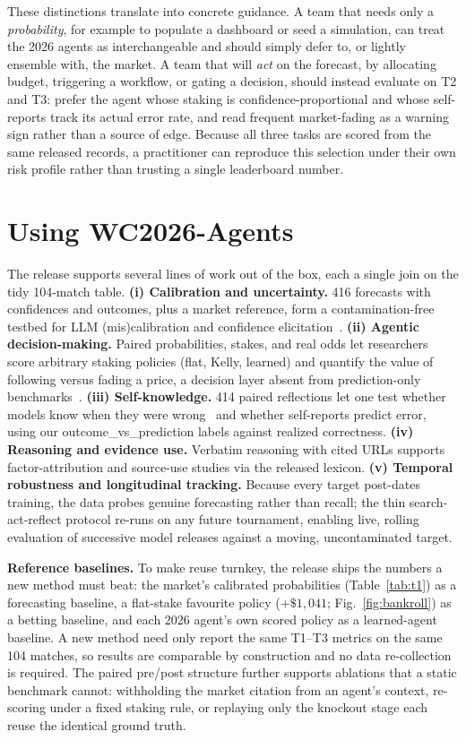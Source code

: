\documentclass[sigconf,review]{acmart}
\begin{document}
These distinctions translate into concrete guidance. A team that needs only a
\emph{probability}, for example to populate a dashboard or seed a simulation, can
treat the 2026 agents as interchangeable and should simply defer to, or lightly
ensemble with, the market. A team that will \emph{act} on the forecast, by
allocating budget, triggering a workflow, or gating a decision, should instead
evaluate on T2 and T3: prefer the agent whose staking is confidence-proportional
and whose self-reports track its actual error rate, and read frequent
market-fading as a warning sign rather than a source of edge. Because all three
tasks are scored from the same released records, a practitioner can reproduce
this selection under their own risk profile rather than trusting a single
leaderboard number.

\section{Using WC2026-Agents}
\label{sec:using}
The release supports several lines of work out of the box, each a single join on
the tidy 104-match table. \textbf{(i) Calibration and uncertainty.} 416
forecasts with confidences and outcomes, plus a market reference, form a
contamination-free testbed for LLM (mis)calibration and confidence
elicitation~\cite{tian2023calibration,xiong2024uncertainty}. \textbf{(ii) Agentic
decision-making.} Paired probabilities, stakes, and real odds let researchers
score arbitrary staking policies (flat, Kelly, learned) and quantify the value of
following versus fading a price, a decision layer absent from prediction-only
benchmarks~\cite{karger2024forecastbench}. \textbf{(iii) Self-knowledge.} 414
paired reflections let one test whether models know when they were
wrong~\cite{kadavath2022know,huang2024selfcorrect} and whether self-reports
predict error, using our \textsf{outcome\_vs\_prediction} labels against realized
correctness. \textbf{(iv) Reasoning and evidence use.} Verbatim reasoning with
cited URLs supports factor-attribution and source-use studies via the released
lexicon. \textbf{(v) Temporal robustness and longitudinal tracking.} Because every
target post-dates training, the data probes genuine forecasting rather than
recall; the thin search-act-reflect protocol re-runs on any future tournament,
enabling live, rolling evaluation of successive model releases against a moving,
uncontaminated target.

\textbf{Reference baselines.} To make reuse turnkey, the release ships the
numbers a new method must beat: the market's calibrated probabilities
(Table~\ref{tab:t1}) as a forecasting baseline, a flat-stake favourite policy
($+\$1{,}041$; Fig.~\ref{fig:bankroll}) as a betting baseline, and each 2026
agent's own scored policy as a learned-agent baseline. A new method need only
report the same T1--T3 metrics on the same 104 matches, so results are comparable
by construction and no data re-collection is required. The paired pre/post
structure further supports ablations that a static benchmark cannot: withholding
the market citation from an agent's context, re-scoring under a fixed staking
rule, or replaying only the knockout stage each reuse the identical ground truth.
\end{document}
